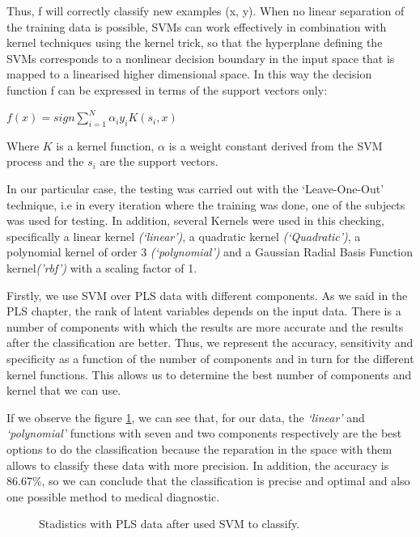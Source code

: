 Thus, f will correctly classify new examples (x, y). When no linear separation of the training data is possible, SVMs can work effectively in combination with kernel techniques using the kernel trick, so that the hyperplane defining the SVMs corresponds to a nonlinear decision boundary in the input space that is mapped to a linearised higher dimensional space. In this way the decision function f can be expressed in terms of the support vectors only\cite{Gorriz}:

\begin{center}
	$f(x) = sign{\sum_{i=1}^{N} \alpha_{i}y_{i}K(s_{i},x)}$
\end{center}

Where $K$ is a kernel function, $\alpha$ is a weight constant derived from the SVM process and the $s_{i}$ are the support vectors. 

In our particular case, the testing was carried out with the ‘Leave-One-Out’ technique, i.e in every iteration where the training was done, one of the subjects was used for testing. In addition, several Kernels were used in this checking, specifically a linear kernel \textit{(‘linear’)}, a quadratic kernel \textit{(‘Quadratic’)}, a polynomial kernel of order 3 \textit{(‘polynomial’)} and a Gaussian Radial Basis Function kernel\textit{('rbf')} with a scaling factor of 1.

Firstly, we use SVM over PLS data with different components. As we said in the PLS chapter, the rank of latent variables depends on the input data. There is a number of components with which the results are more accurate and the results after the classification are better. Thus, we represent the accuracy, sensitivity and specificity as a function of the number of components and in turn for the different kernel functions. This allows us to determine the best number of components and  kernel that we can use.

If we observe the figure \ref{fig:stadistics_PLS}, we can see that, for our data, the \textit{‘linear’} and \textit{‘polynomial’} functions with seven and two components respectively are the best options to do the classification because the reparation in the space with them allows to classify these data with more precision.  In addition, the accuracy is 86.67\%, so we can conclude that the classification is precise and optimal and also one possible method to medical diagnostic.

\begin{figure}[H]
	\centering
	\caption{Stadistics with PLS data after used SVM to classify.}
	\label{fig:stadistics_PLS}
\end{figure}

